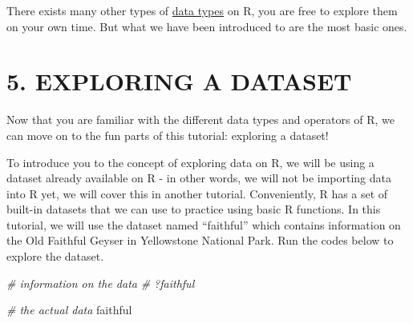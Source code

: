 \documentclass[
]{book}
\newenvironment{Shaded}{\begin{snugshade}}{\end{snugshade}}
\newcommand{\CommentTok}[1]{\textcolor[rgb]{0.56,0.35,0.01}{\textit{#1}}}
\newcommand{\NormalTok}[1]{#1}
\begin{document}
There exists many other types of \href{https://www.statmethods.net/input/datatypes.html}{data types} on R, you are free to explore them on your own time. But what we have been introduced to are the most basic ones.

\hypertarget{exploring-a-dataset}{%
\section{5. EXPLORING A DATASET}\label{exploring-a-dataset}}

Now that you are familiar with the different data types and operators of R, we can move on to the fun parts of this tutorial: exploring a dataset!

To introduce you to the concept of exploring data on R, we will be using a dataset already available on R - in other words, we will not be importing data into R yet, we will cover this in another tutorial. Conveniently, R has a set of built-in datasets that we can use to practice using basic R functions. In this tutorial, we will use the dataset named ``faithful'' which contains information on the Old Faithful Geyser in Yellowstone National Park. Run the codes below to explore the dataset.

\begin{Shaded}
\begin{Highlighting}[]
\CommentTok{\# information on the data}
\CommentTok{\# ?faithful}
\end{Highlighting}
\end{Shaded}

\begin{Shaded}
\begin{Highlighting}[]
\CommentTok{\# the actual data}
\NormalTok{faithful}
\end{Highlighting}
\end{Shaded}
\end{document}
